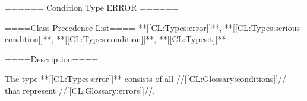 ====== Condition Type ERROR ======

====Class Precedence List==== **[[CL:Types:error]]**, **[[CL:Types:serious-condition]]**, **[[CL:Types:condition]]**, **[[CL:Types:t]]**

====Description====

The type **[[CL:Types:error]]** consists of all //[[CL:Glossary:conditions]]// that represent //[[CL:Glossary:errors]]//.

